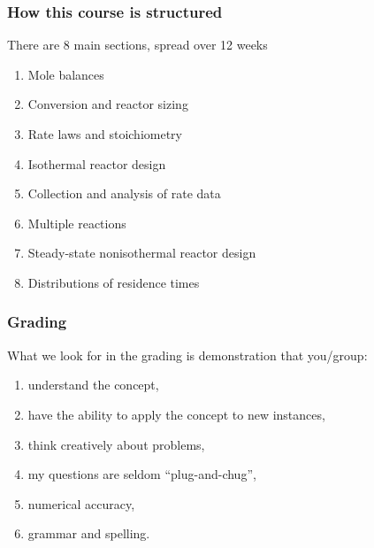 \begin{frame}\frametitle{How this course is structured}
	There are 8 main sections, spread over 12 weeks
	\begin{enumerate}
		\item	Mole balances 
		\item	Conversion and reactor sizing
		\item	Rate laws and stoichiometry
		\item	Isothermal reactor design
		\item	Collection and analysis of rate data
		\item	Multiple reactions
		\item	Steady-state nonisothermal reactor design 
		\item	Distributions of residence times 
	\end{enumerate}
\end{frame}

\begin{frame}\frametitle{Grading}
	What we look for in the grading is demonstration that you/group: 
	\begin{enumerate}
		\item	understand the concept, 
		\item	have the ability to apply the concept to new instances, 
		\item	think creatively about problems, 
		\item	my questions are seldom ``plug-and-chug'',
		\item	numerical accuracy, 
		\item	grammar and spelling.
	\end{enumerate}
\end{frame}


